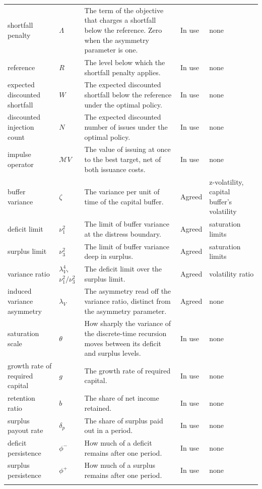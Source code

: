 \documentclass[11pt]{article}
\newcommand{\nrow}[5]{#1 & #2 & #3 & #4 & #5 \\ \addlinespace}
\begin{document}
\begin{longtable}{@{}P{3.3cm}P{1.5cm}P{6.0cm}P{1.3cm}P{2.6cm}@{}}
\nrow{shortfall penalty}{$\Lambda$}{The term of the objective that charges a shortfall below the reference. Zero when the asymmetry parameter is one.}{In use}{none}
\nrow{reference}{$R$}{The level below which the shortfall penalty applies.}{In use}{none}
\nrow{expected discounted shortfall}{$W$}{The expected discounted shortfall below the reference under the optimal policy.}{In use}{none}
\nrow{discounted injection count}{$N$}{The expected discounted number of issues under the optimal policy.}{In use}{none}
\nrow{impulse operator}{$\mathcal MV$}{The value of issuing at once to the best target, net of both issuance costs.}{In use}{none}
\nrow{buffer variance}{$\zeta$}{The variance per unit of time of the capital buffer.}{Agreed}{z-volatility, capital buffer's volatility}
\nrow{deficit limit}{$\nu_1^2$}{The limit of buffer variance at the distress boundary.}{Agreed}{saturation limits}
\nrow{surplus limit}{$\nu_3^2$}{The limit of buffer variance deep in surplus.}{Agreed}{saturation limits}
\nrow{variance ratio}{$\lambda_V^4$, $\nu_1^2/\nu_3^2$}{The deficit limit over the surplus limit.}{Agreed}{volatility ratio}
\nrow{induced variance asymmetry}{$\lambda_V$}{The asymmetry read off the variance ratio, distinct from the asymmetry parameter.}{Agreed}{none}
\nrow{saturation scale}{$\theta$}{How sharply the variance of the discrete-time recursion moves between its deficit and surplus levels.}{In use}{none}
\nrow{growth rate of required capital}{$g$}{The growth rate of required capital.}{In use}{none}
\nrow{retention ratio}{$b$}{The share of net income retained.}{In use}{none}
\nrow{surplus payout rate}{$\delta_p$}{The share of surplus paid out in a period.}{In use}{none}
\nrow{deficit persistence}{$\phi^-$}{How much of a deficit remains after one period.}{In use}{none}
\nrow{surplus persistence}{$\phi^+$}{How much of a surplus remains after one period.}{In use}{none}
\bottomrule
\end{longtable}
\normalsize



\end{document}
